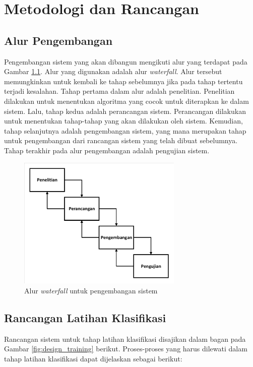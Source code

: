 \chapter{Metodologi dan Rancangan}

\section{Alur Pengembangan}

Pengembangan sistem yang akan dibangun mengikuti alur yang terdapat pada Gambar \ref{fig:waterfall}. Alur yang digunakan adalah alur \textit{waterfall}. Alur tersebut memungkinkan untuk kembali ke tahap sebelumnya jika pada tahap tertentu terjadi kesalahan. Tahap pertama dalam alur adalah penelitian. Penelitian dilakukan untuk menentukan algoritma yang cocok untuk diterapkan ke dalam sistem. Lalu, tahap kedua adalah perancangan sistem. Perancangan dilakukan untuk menentukan tahap-tahap yang akan dilakukan oleh sistem. Kemudian, tahap selanjutnya adalah pengembangan sistem, yang mana merupakan tahap untuk pengembangan dari rancangan sistem yang telah dibuat sebelumnya. Tahap terakhir pada alur pengembangan adalah pengujian sistem.

\begin{figure}[H]
	\centering
	\includegraphics[width=0.7\textwidth, trim=2 2 2 2, clip]{resources/3/waterfall.pdf}
	\caption{Alur \textit{waterfall} untuk pengembangan sistem}
	\label{fig:waterfall}
\end{figure}

\section{Rancangan Latihan Klasifikasi}

Rancangan sistem untuk tahap latihan klasifikasi disajikan dalam bagan pada Gambar \ref{fig:design_training} berikut. Proses-proses yang harus dilewati dalam tahap latihan klasifikasi dapat dijelaskan sebagai berikut:

